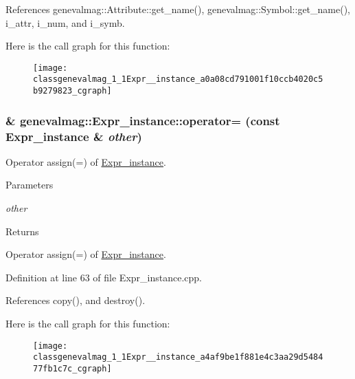 References genevalmag::Attribute::get\_\-name(), genevalmag::Symbol::get\_\-name(), i\_\-attr, i\_\-num, and i\_\-symb.



Here is the call graph for this function:\nopagebreak
\begin{figure}[H]
\begin{center}
\leavevmode
\texttt{[image: classgenevalmag\_1\_1Expr\_\_instance\_a0a08cd791001f10ccb4020c5b9279823\_cgraph]}
\end{center}
\end{figure}


\hypertarget{classgenevalmag_1_1Expr__instance_a4af9be1f881e4c3aa29d548477fb1c7c}{
\subsubsection[{operator=}]{ \& genevalmag::Expr\_\-instance::operator= (const {\bf Expr\_\-instance} \& {\em other})}}
\label{classgenevalmag_1_1Expr__instance_a4af9be1f881e4c3aa29d548477fb1c7c}
Operator assign(=) of \hyperlink{classgenevalmag_1_1Expr__instance}{Expr\_\-instance}. 
\begin{DoxyParams}{Parameters}
\item[{\em other}]\end{DoxyParams}
\begin{DoxyReturn}{Returns}

\end{DoxyReturn}
Operator assign(=) of \hyperlink{classgenevalmag_1_1Expr__instance}{Expr\_\-instance}. 

Definition at line 63 of file Expr\_\-instance.cpp.



References copy(), and destroy().



Here is the call graph for this function:\nopagebreak
\begin{figure}[H]
\begin{center}
\leavevmode
\texttt{[image: classgenevalmag\_1\_1Expr\_\_instance\_a4af9be1f881e4c3aa29d548477fb1c7c\_cgraph]}
\end{center}
\end{figure}


